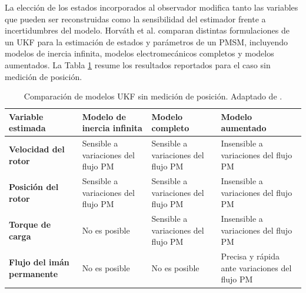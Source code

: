 La elección de los estados incorporados al observador modifica tanto las variables que pueden ser reconstruidas como la sensibilidad del estimador frente a incertidumbres del modelo. Horváth et al. \cite{horvathLoadTorquePermanent2023} comparan distintas formulaciones de un UKF para la estimación de estados y parámetros de un PMSM, incluyendo modelos de inercia infinita, modelos electromecánicos completos y modelos aumentados. La Tabla \ref{tab:comparacion_ukf_sensorless} resume los resultados reportados para el caso sin medición de posición.


\begin{table}[htbp]
    \centering
    \caption{Comparación de modelos UKF sin medición de posición.
    Adaptado de \cite{horvathLoadTorquePermanent2023}.}
    \label{tab:comparacion_ukf_sensorless}

    \renewcommand{\arraystretch}{1.35}
    \setlength{\tabcolsep}{5pt}
    \small

    \begin{tabularx}{\textwidth}{
        |>{\raggedright\arraybackslash}p{3.2cm}
        |>{\centering\arraybackslash}X
        |>{\centering\arraybackslash}X
        |>{\centering\arraybackslash}X|
    }
        \hline

        \textbf{Variable estimada} &
        \textbf{Modelo de inercia infinita} &
        \textbf{Modelo completo} &
        \textbf{Modelo aumentado} \\
        \hline

        \textbf{Velocidad del rotor} &
        Sensible a variaciones del flujo PM &
        Sensible a variaciones del flujo PM &
        Insensible a variaciones del flujo PM \\
        \hline

        \textbf{Posición del rotor} &
        Sensible a variaciones del flujo PM &
        Sensible a variaciones del flujo PM &
        Insensible a variaciones del flujo PM \\
        \hline

        \textbf{Torque de carga} &
        No es posible &
        Sensible a variaciones del flujo PM &
        Insensible a variaciones del flujo PM \\
        \hline

        \textbf{Flujo del imán permanente} &
        No es posible &
        No es posible &
        Precisa y rápida ante variaciones del flujo PM \\
        \hline

    \end{tabularx}
\end{table}


